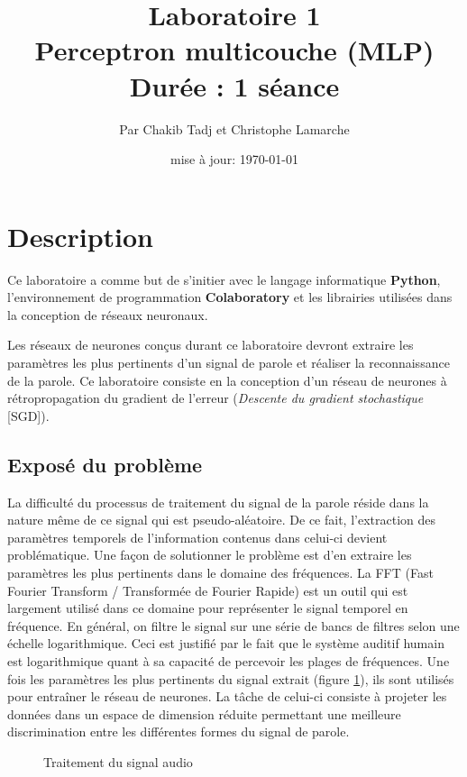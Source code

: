 \documentclass{article}
\title{Laboratoire 1\\
  \large Perceptron multicouche (MLP)\\
  \normalsize Durée : 1 séance}
\author{Par Chakib Tadj et Christophe Lamarche}
\date{mise à jour: \today}
\begin{document}
\maketitle

\section{Description}
Ce laboratoire a comme but de s'initier avec le langage informatique \textbf{Python}, l'environnement de programmation \textbf{Colaboratory} et les librairies utilisées dans la conception de réseaux neuronaux.

\medbreak
Les réseaux de neurones conçus durant ce laboratoire devront extraire les paramètres les plus pertinents d'un signal de parole et réaliser la reconnaissance de la parole. Ce laboratoire consiste en la conception d'un réseau de neurones à rétropropagation du gradient de l'erreur (\textit{Descente du gradient stochastique} [SGD]).

\subsection{Exposé du problème}
La difficulté du processus de traitement du signal de la parole réside dans la nature même de ce signal qui est pseudo-aléatoire. De ce fait, l'extraction des paramètres temporels de l'information contenus dans celui-ci devient problématique. Une façon de solutionner le problème est d'en extraire les paramètres les plus pertinents dans le domaine des fréquences. La FFT (Fast Fourier Transform / Transformée de Fourier Rapide) est un outil qui est largement utilisé dans ce domaine pour représenter le signal temporel en fréquence. En général, on filtre le signal sur une série de bancs de filtres selon une échelle logarithmique. Ceci est justifié par le fait que le système auditif humain est logarithmique quant à sa capacité de percevoir les plages de fréquences. Une fois les paramètres les plus pertinents du signal extrait (figure \ref{fig:traitement_signal}), ils sont utilisés pour entraîner le réseau de neurones. La tâche de celui-ci consiste à projeter les données dans un espace de dimension réduite permettant une meilleure discrimination entre les différentes formes du signal de parole.

\begin{figure}[H]
  \centering
  \caption{Traitement du signal audio}
  \label{fig:traitement_signal}
\end{figure}
\end{document}
